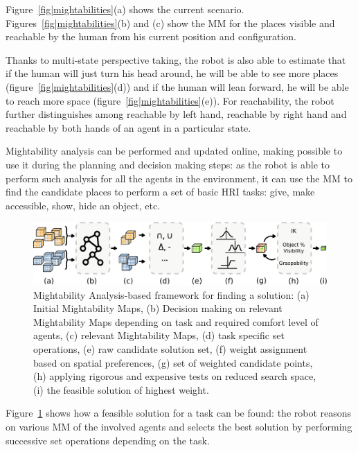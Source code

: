 \documentclass{svmult}
\begin{document}
Figure~\ref{fig|mightabilities}(a) shows the current scenario.
Figures~\ref{fig|mightabilities}(b) and (c) show the MM for the places visible
and reachable by the human from his current position and configuration.

Thanks to multi-state perspective taking, the robot is also able to estimate
that if the human will just turn his head around, he will be able to see more
places (figure~\ref{fig|mightabilities}(d)) and if the human will lean forward,
he will be able to reach more space (figure~\ref{fig|mightabilities}(e)). For
reachability, the robot further distinguishes among reachable by left hand,
reachable by right hand and reachable by both hands of an agent in a particular
state.  

Mightability analysis can be performed and updated online, making possible to
use it during the planning and decision making steps: as the robot is able to
perform such analysis for all the agents in the environment, it can use the MM
to find the candidate places to perform a set of basic HRI tasks: give, make
accessible, show, hide an object, etc. 

\begin{figure}
  \centering
  \includegraphics[width=\textwidth]{./figs/mightab-steps.pdf}

\caption { Mightability Analysis-based framework for finding a solution: (a)
Initial Mightability Maps, (b) Decision making on relevant Mightability Maps
depending on task and required comfort level of agents, (c) relevant
Mightability Maps, (d) task specific set operations, (e) raw candidate solution
set, (f) weight assignment based on spatial preferences, (g) set of weighted
candidate points, (h) applying rigorous and expensive tests on reduced search
space, (i) the feasible solution of highest weight.}

  \label{fig|mightabilities-framework}
\end{figure}


Figure~\ref{fig|mightabilities-framework} shows how a feasible solution for a
task can be found: the robot reasons on various MM of the involved agents and
selects the best solution by performing successive set operations depending on
the task.
\end{document}
